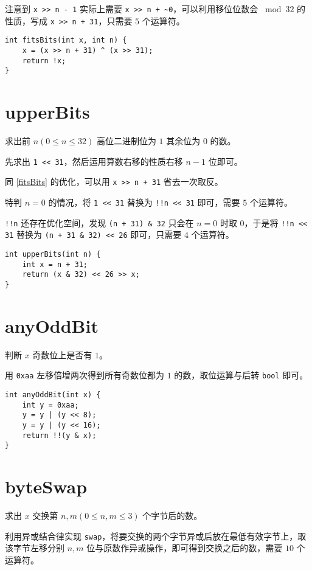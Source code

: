 \documentclass{noithesis}
\begin{document}
	注意到 \verb|x >> n - 1| 实际上需要 \verb|x >> n + ~0|，可以利用移位位数会 $\bmod 32$ 的性质，写成 \verb|x >> n + 31|，只需要 $5$ 个运算符。
	
\begin{lstlisting}
int fitsBits(int x, int n) {
	x = (x >> n + 31) ^ (x >> 31);
	return !x;
}
\end{lstlisting} 

	\section{upperBits}
	
	求出前 $n(0\leq n\leq 32)$ 高位二进制位为 $1$ 其余位为 $0$ 的数。
	
	先求出 \verb|1 << 31|，然后运用算数右移的性质右移 $n-1$ 位即可。
	
	同 \ref{fitsBits} 的优化，可以用 \verb|x >> n + 31| 省去一次取反。
	
	特判 $n=0$ 的情况，将 \verb|1 << 31| 替换为 \verb|!!n << 31| 即可，需要 $5$ 个运算符。
	
	\verb|!!n| 还存在优化空间，发现 \verb|(n + 31) & 32| 只会在 $n=0$ 时取 $0$，于是将 \verb|!!n << 31| 替换为 \verb|(n + 31 & 32) << 26| 即可，只需要 $4$ 个运算符。
	
\begin{lstlisting}
int upperBits(int n) {
	int x = n + 31;
	return (x & 32) << 26 >> x;
}
\end{lstlisting} 

	\section{anyOddBit}
	
	判断 $x$ 奇数位上是否有 $1$。
	
	用 \verb|0xaa| 左移倍增两次得到所有奇数位都为 $1$ 的数，取位运算与后转 \verb|bool| 即可。
	
\begin{lstlisting}
int anyOddBit(int x) {
	int y = 0xaa;
	y = y | (y << 8);
	y = y | (y << 16);
	return !!(y & x);
}
\end{lstlisting} 
	
	\section{byteSwap}
	
	求出 $x$ 交换第 $n,m(0\leq n,m\leq 3)$ 个字节后的数。
	
	利用异或结合律实现 \verb|swap|，将要交换的两个字节异或后放在最低有效字节上，取该字节左移分别 $n,m$ 位与原数作异或操作，即可得到交换之后的数，需要 $10$ 个运算符。
	
\end{document}
